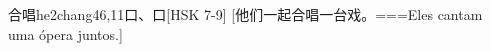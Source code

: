 \begin{EntryWithPhonetic}{合唱}{he2chang4}{6,11}{⼝、⼝}[HSK 7-9]
  [他们一起合唱一台戏。===Eles cantam uma ópera juntos.]
\end{EntryWithPhonetic}
